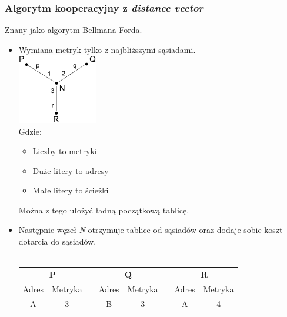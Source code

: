 			\subsubsection{Algorytm kooperacyjny z \emph{distance vector}}
				Znany jako algorytm Bellmana-Forda.
				\begin{itemize}
					\item Wymiana metryk tylko z najbliższymi sąsiadami.\\
					\includegraphics[width=3.5cm]{./images/image40.pdf}\\
					Gdzie:
					\begin{itemize}
						\item Liczby to metryki
						\item Duże litery to adresy
						\item Małe litery to ścieżki
					\end{itemize}
					Można z tego ułożyć ładną początkową tablicę.
					\item Następnie węzeł \emph{N} otrzymuje tablice od sąsiadów oraz dodaje sobie koszt dotarcia do sąsiadów.\\\\
					\begin{tabular}{cccccccc}
						\cline{1-2} \cline{4-5} \cline{7-8}
						\multicolumn{2}{|c|}{\textbf{P}}                                    & \multicolumn{1}{c|}{} & \multicolumn{2}{c|}{\textbf{Q}}                                    & \multicolumn{1}{c|}{} & \multicolumn{2}{c|}{\textbf{R}}                                    \\ \cline{1-2} \cline{4-5} \cline{7-8} 
						\multicolumn{1}{|c|}{Adres} & \multicolumn{1}{c|}{Metryka} & \multicolumn{1}{c|}{} & \multicolumn{1}{c|}{Adres} & \multicolumn{1}{c|}{Metryka} & \multicolumn{1}{c|}{} & \multicolumn{1}{c|}{Adres} & \multicolumn{1}{c|}{Metryka} \\ \cline{1-2} \cline{4-5} \cline{7-8} 
						\multicolumn{1}{|c|}{A}     & \multicolumn{1}{c|}{3}       & \multicolumn{1}{c|}{} & \multicolumn{1}{c|}{B}     & \multicolumn{1}{c|}{3}       & \multicolumn{1}{c|}{} & \multicolumn{1}{c|}{A}     & \multicolumn{1}{c|}{4}       \\ \cline{1-2} \cline{4-5} \cline{7-8} 

\end{tabular}
\end{itemize}
